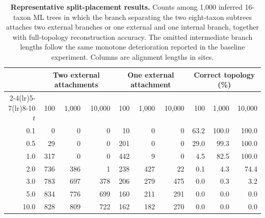 \begin{table}[p]
  \centering
  \small
  \begin{tabular}{rrrrrrrrrr}
    \toprule
    & \multicolumn{3}{c}{Two external attachments} & \multicolumn{3}{c}{One external attachment} & \multicolumn{3}{c}{Correct topology (\%)} \\
    \cmidrule(lr){2-4}\cmidrule(lr){5-7}\cmidrule(lr){8-10}
    \(t\) & 100 & 1,000 & 10,000 & 100 & 1,000 & 10,000 & 100 & 1,000 & 10,000 \\
    \midrule
    0.1 & 0 & 0 & 0 & 10 & 0 & 0 & 63.2 & 100.0 & 100.0 \\
    0.5 & 29 & 0 & 0 & 201 & 0 & 0 & 29.0 & 99.3 & 100.0 \\
    1.0 & 317 & 0 & 0 & 442 & 9 & 0 & 4.5 & 82.5 & 100.0 \\
    2.0 & 736 & 386 & 1 & 238 & 427 & 22 & 0.1 & 4.3 & 74.4 \\
    3.0 & 783 & 697 & 378 & 206 & 279 & 475 & 0.0 & 0.3 & 3.2 \\
    5.0 & 834 & 776 & 699 & 160 & 211 & 291 & 0.0 & 0.0 & 0.0 \\
    10.0 & 828 & 809 & 722 & 162 & 182 & 270 & 0.0 & 0.0 & 0.0 \\
    \bottomrule
  \end{tabular}
  \caption{\textbf{Representative split-placement results.} Counts among 1,000 inferred 16-taxon ML trees in which the branch separating the two eight-taxon subtrees attaches two external branches or one external and one internal branch, together with full-topology reconstruction accuracy. The omitted intermediate branch lengths follow the same monotone deterioration reported in the baseline experiment. Columns are alignment lengths in sites.}
  \makeatletter{}\makeatother
\end{table}

